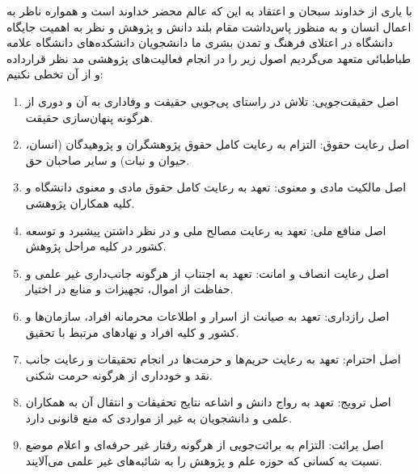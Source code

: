با یاری از خداوند سبحان و اعتقاد به این که عالم محضر خداوند است و همواره ناظر به اعمال انسان و به منظور پاس‌داشت مقام بلند دانش و پژوهش و نظر به اهمیت جایگاه دانشگاه در اعتلای فرهنگ و تمدن بشری ما دانشجویان دانشکده‌های دانشگاه علامه طباطبائی متعهد می‌گردیم اصول زیر را در انجام فعالیت‌های پژوهشی مد نظر قرارداده و از آن تخطی نکنیم:
\begin{enumerate}
\item
اصل حقیقت‌جویی: تلاش در راستای پی‌جویی حقیقت و وفاداری به آن و دوری از هرگونه پنهان‌سازی حقیقت.
\item
اصل رعایت حقوق: التزام به رعایت کامل حقوق پژوهشگران و پژوهیدگان (انسان، حیوان و نبات) و سایر صاحبان حق.
\item
اصل مالکیت مادی و معنوی: تعهد به رعایت کامل حقوق مادی و معنوی دانشگاه و کلیه همکاران پژوهشی.
\item
اصل منافع ملی: تعهد به رعایت مصالح ملی و در نظر داشتن پیشبرد و توسعه کشور در کلیه مراحل پژوهش.
\item
اصل رعایت انصاف و امانت: تعهد به اجتناب از هرگونه جانب‌داری غیر علمی و حفاظت از اموال، تجهیزات و منابع در اختیار.
\item
اصل رازداری: تعهد به صیانت از اسرار و اطلاعات محرمانه افراد، سازمان‌ها و کشور و کلیه افراد و نهادهای مرتبط با تحقیق.
\item
اصل احترام: تعهد به رعایت حریم‌ها و حرمت‌ها در انجام تحقیقات و رعایت جانب نقد و خودداری از هرگونه حرمت شکنی.
\item
اصل ترویج: تعهد به رواج دانش و اشاعه نتایج تحقیقات و انتقال آن به همکاران علمی و دانشجویان به غیر از مواردی که منع قانونی دارد.
\item
اصل برائت: التزام به برائت‌جویی از هرگونه رفتار غیر حرفه‌ای و اعلام موضع نسبت به کسانی که حوزه علم و پژوهش را به شائبه‌های غیر علمی می‌آلایند.

\end{enumerate}

